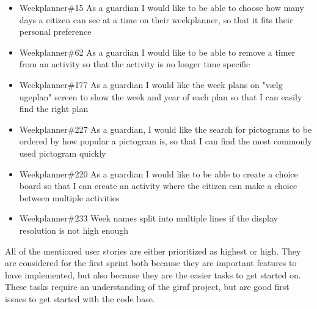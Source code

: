 \begin{itemize}
    \item Weekplanner\#15 As a guardian I would like to be able to choose how many days a citizen can see at a time on their weekplanner, so that it fits their personal preference 
    \item Weekplanner\#62 As a guardian I would like to be able to remove a timer from an activity so that the activity is no longer time specific
    \item Weekplanner\#177 As a guardian I would like the week plans on "vælg ugeplan" screen to show the week and year of each plan so that I can easily find the right plan 
    \item Weekplanner\#227 As a guardian, I would like the search for pictograms to be ordered by how popular a pictogram is, so that I can find the most commonly used pictogram quickly
    \item Weekplanner\#220 As a guardian I would like to be able to create a choice board so that I can create an activity where the citizen can make a choice between multiple activities 
    \item Weekplanner\#233 Week names split into multiple lines if the display resolution is not high enough 
\end{itemize}
\noindent
All of the mentioned user stories are either prioritized as highest or high. 
They are considered for the first sprint both because they are important features to have implemented, but also because they are the easier tasks to get started on.
These tasks require an understanding of the giraf project, but are good first issues to get started with the code base.
